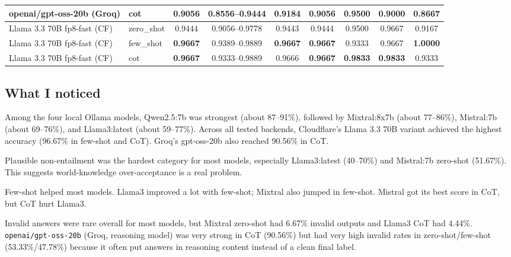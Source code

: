 \documentclass[11pt, a4paper]{article}
\begin{document}
\begin{table}[htbp]
\begin{tabularx}{\textwidth}{>{\raggedright\arraybackslash}X l c c c c c c c}
openai/gpt-oss-20b (Groq) & cot & 0.9056 & 0.8556--0.9444 & 0.9184 & 0.9056 & 0.9500 & 0.9000 & 0.8667 \\
\midrule
Llama 3.3 70B fp8-fast (CF) & zero\_shot & 0.9444 & 0.9056--0.9778 & 0.9443 & 0.9444 & 0.9500 & 0.9667 & 0.9167 \\
\rowcolor{rowtint}
Llama 3.3 70B fp8-fast (CF) & few\_shot & \textbf{0.9667} & 0.9389--0.9889 & \textbf{0.9667} & \textbf{0.9667} & 0.9333 & 0.9667 & \textbf{1.0000} \\
\rowcolor{rowtint}
Llama 3.3 70B fp8-fast (CF) & cot & \textbf{0.9667} & 0.9333--0.9889 & 0.9666 & \textbf{0.9667} & \textbf{0.9833} & \textbf{0.9833} & 0.9333 \\
\bottomrule
\end{tabularx}
\end{table}

\subsection*{\color{bambergnavy} What I noticed}
Among the four local Ollama models, Qwen2.5:7b was strongest (about 87--91\%), followed by Mixtral:8x7b (about 77--86\%), Mistral:7b (about 69--76\%), and Llama3:latest (about 59--77\%). Across all tested backends, Cloudflare's Llama 3.3 70B variant achieved the highest accuracy (96.67\% in few-shot and CoT). Groq's gpt-oss-20b also reached 90.56\% in CoT.

Plausible non-entailment was the hardest category for most models, especially Llama3:latest (40--70\%) and Mistral:7b zero-shot (51.67\%). This suggests world-knowledge over-acceptance is a real problem.

Few-shot helped most models. Llama3 improved a lot with few-shot; Mixtral also jumped in few-shot. Mistral got its best score in CoT, but CoT hurt Llama3.

Invalid answers were rare overall for most models, but Mixtral zero-shot had 6.67\% invalid outputs and Llama3 CoT had 4.44\%. \texttt{openai/gpt-oss-20b} (Groq, reasoning model) was very strong in CoT (90.56\%) but had very high invalid rates in zero-shot/few-shot (53.33\%/47.78\%) because it often put answers in reasoning content instead of a clean final label.
\end{document}
